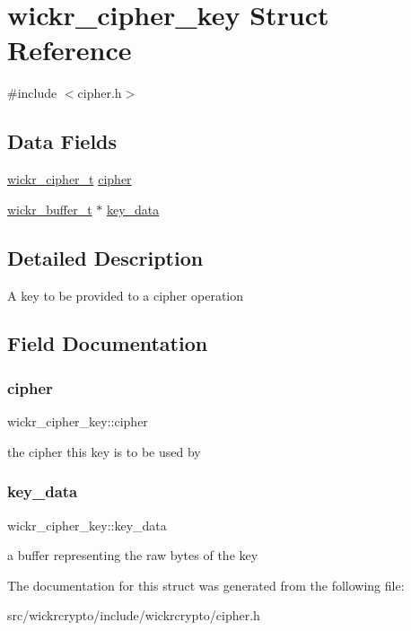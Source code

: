 \hypertarget{structwickr__cipher__key}{}\section{wickr\+\_\+cipher\+\_\+key Struct Reference}
\label{structwickr__cipher__key}


{\ttfamily \#include $<$cipher.\+h$>$}

\subsection*{Data Fields}
\begin{DoxyCompactItemize}
\item 
\mbox{\hyperlink{structwickr__cipher}{wickr\+\_\+cipher\+\_\+t}} \mbox{\hyperlink{structwickr__cipher__key_a6506e1a07f7bc2c5ceeb0ca5ce81385b}{cipher}}
\item 
\mbox{\hyperlink{structwickr__buffer}{wickr\+\_\+buffer\+\_\+t}} $\ast$ \mbox{\hyperlink{structwickr__cipher__key_a0bf9fa22f1db80010410ae609aac8a2a}{key\+\_\+data}}
\end{DoxyCompactItemize}


\subsection{Detailed Description}
A key to be provided to a cipher operation 

\subsection{Field Documentation}
\mbox{\label{structwickr__cipher__key_a6506e1a07f7bc2c5ceeb0ca5ce81385b}} 
\subsubsection{\texorpdfstring{cipher}{cipher}}
{\footnotesize\ttfamily wickr\+\_\+cipher\+\_\+key\+::cipher}

the cipher this key is to be used by \mbox{\label{structwickr__cipher__key_a0bf9fa22f1db80010410ae609aac8a2a}} 
\subsubsection{\texorpdfstring{key\_data}{key\_data}}
{\footnotesize\ttfamily wickr\+\_\+cipher\+\_\+key\+::key\+\_\+data}

a buffer representing the raw bytes of the key 

The documentation for this struct was generated from the following file\+:\begin{DoxyCompactItemize}
\item 
src/wickrcrypto/include/wickrcrypto/cipher.\+h\end{DoxyCompactItemize}
